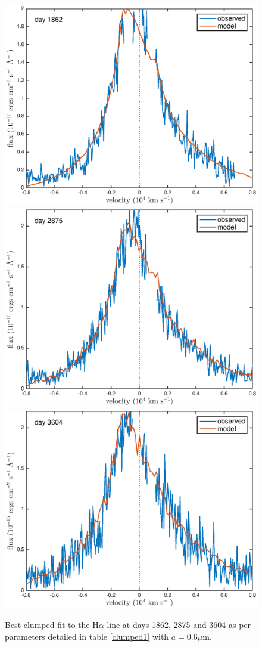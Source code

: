 \documentclass[useAMS,usenatbib,usegraphicx]{mnras}
\begin{document}
\begin{figure}
\begin{center}
\caption{Best clumped fit to the H$\alpha$ line at days 1862, 2875 and 3604 as per parameters detailed in table \ref{clumped1} with $a=0.6\mu$m.}
\label{d1862_3604_c}
\includegraphics[trim =37 10 45 15,clip=true,scale=0.35]{clump_1/maximum/d1862Ha}
\includegraphics[trim =55 10 45 15,clip=true,scale=0.35]{clump_1/maximum/d2875Ha}
\includegraphics[trim =55 10 45 15,clip=true,scale=0.35]{clump_1/maximum/d3604Ha}

\end{center}
\end{figure}
\end{document}
